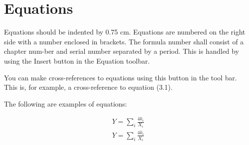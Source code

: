 \section{Equations}
Equations should be indented by 0.75 cm. Equations are numbered on the right side with a number enclosed in brackets. The formula number shall consist of a chapter num-ber and serial number separated by a period. This is handled by using the Insert button in the Equation toolbar. 

You can make cross-references to equations using this button in the tool bar. This is, for example, a cross-reference to equation (3.1). 

The following are examples of equations:

\begin{align}
Y=\sum_{i}\frac{4k_i}{X_i} \\
Y=\sum_{i}\frac{4k_i}{X_i}
\end{align}